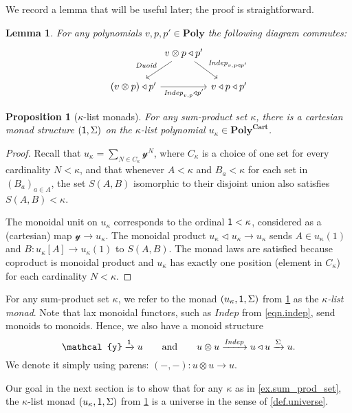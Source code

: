 \documentclass[11pt, one side, article]{memoir}
\theoremstyle{definition}
\theoremstyle{plain}
\newtheorem{proposition}[definitionx]{Proposition}
\newtheorem{lemma}[definitionx]{Lemma}
\newenvironment{definition}
  {\pushQED{\qed}\renewcommand{\qedsymbol}{$\lozenge$}\definitionx}
  {\popQED\enddefinitionx}
\newcommand{\Cat}[1]{\mathbf{#1}}%
\newcommand{\Fun}[1]{\mathit{#1}}%
\newcommand{\To}[2][]{\xrightarrow[#1]{#2}}
\newcommand{\yon}{\mathcal{y}}
\newcommand{\poly}{\Cat{Poly}}
\newcommand{\polycart}{\poly^{\Cat{Cart}}}
\newcommand{\0}{\textsf{0}}
\newcommand{\1}{\tn{\textsf{1}}}
\newcommand{\tri}{\mathbin{\triangleleft}}
\newcommand{\indep}{\Fun{Indep}}
\newcommand{\duoid}{\Fun{Duoid}}
\newcommand{\qqand}{\qquad\text{and}\qquad}
\begin{document}
We record a lemma that will be useful later; the proof is straightforward.

\begin{lemma}\label{lemma.duoid_indep}
For any polynomials $v,p,p'\in\poly$ the following diagram commutes:
\[
\begin{tikzcd}[column sep=0]
	&v\otimes p\tri p'\ar[dl, "\duoid"']\ar[dr, "\indep_{v,p\tri p'}"]\\
	(v\otimes p)\tri p'\ar[rr, "\indep_{v,p}\tri p'"']&&v\tri p\tri p'
\end{tikzcd}
\]
\end{lemma}

\begin{proposition}[$\kappa$-list monads]\label{prop.list_monad}
For any sum-product set $\kappa$, there is a cartesian monad structure $(\1,\Sigma)$ on the $\kappa$-list polynomial $u_\kappa\in\polycart$.
\end{proposition}
\begin{proof}
Recall that $u_\kappa=\sum_{N\in C_\kappa}\yon^N$, where $C_\kappa$ is a choice of one set for every cardinality $N<\kappa$, and that whenever $A<\kappa$ and $B_a<\kappa$ for each set in $(B_a)_{a\in A}$, the set $S(A,B)$ isomorphic to their disjoint union also satisfies $S(A,B)<\kappa$. 

The monoidal unit on $u_\kappa$ corresponds to the ordinal $\1<\kappa$, considered as a (cartesian) map $\yon\to u_\kappa$. The monoidal product $u_\kappa\tri u_\kappa\to u_\kappa$ sends $A\in u_\kappa(1)$ and $B\colon u_\kappa[A]\to u_\kappa(1)$ to $S(A,B)$. The monad laws are satisfied because coproduct is monoidal product and $u_\kappa$ has exactly one position (element in $C_\kappa$) for each cardinality $N<\kappa$. 
\end{proof}

\begin{definition}[$\kappa$-list monads]
For any sum-product set $\kappa$, we refer to the monad $(u_\kappa,\1,\Sigma)$ from \cref{prop.list_monad} as the \emph{$\kappa$-list monad}. Note that lax monoidal functors, such as $\indep$ from \eqref{eqn.indep}, send monoids to monoids. Hence, we also have a monoid structure 
\begin{equation}\label{eqn.otimes_monoid}
	\yon\To{\1} u
	\qqand
	u\otimes u\To{\indep} u\tri u\To{\Sigma}u.
\end{equation}
We denote it simply using parens: $(-,-)\colon u\otimes u\to u$.
\end{definition}

Our goal in the next section is to show that for any $\kappa$ as in \cref{ex.sum_prod_set}, the $\kappa$-list monad $(u_\kappa,\1,\Sigma)$ from \cref{prop.list_monad} is a universe in the sense of \cref{def.universe}.
\end{document}
